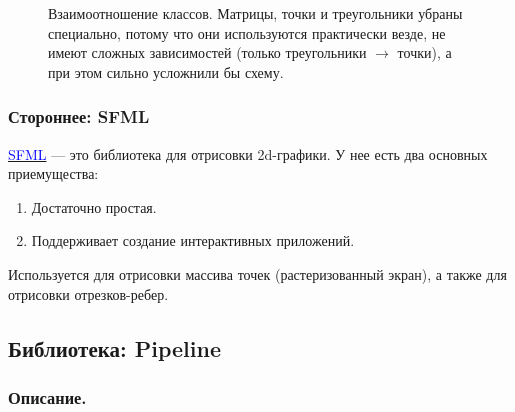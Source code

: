 \documentclass{article}
\begin{document}
\begin{center}
\begin{figure}[H]
\caption{Взаимоотношение классов. Матрицы, точки и треугольники убраны специально, потому что они используются практически везде, не имеют сложных зависимостей (только треугольники $\to$ точки), а при этом сильно усложнили бы схему. }
\label{ris:image}
\end{figure}
\end{center}

\subsubsection{Стороннее: SFML}

\href{https://www.sfml-dev.org/}{\textcolor{blue}{SFML}} --- это библиотека для отрисовки 2d-графики. У нее есть два основных приемущества:

\begin{enumerate}

\item Достаточно простая.
\item Поддерживает создание интерактивных приложений.

\end{enumerate}

Используется для отрисовки массива точек (растеризованный экран), а также для отрисовки отрезков-ребер.


\newpage
\subsection{Библиотека: Pipeline}

\subsubsection{Описание.}
\end{document}
